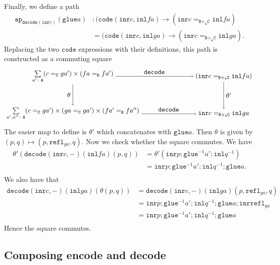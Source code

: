 \message{ !name(notes.tex)}\documentclass[12pt]{amsart}
\newcommand{\inv}{^{-1}}
\newcommand{\type}[1]{\mathtt{#1}}
\newcommand{\tin}{\colon}
\newcommand{\A}{\type{A}}
\newcommand{\B}{\type{B}}
\newcommand{\C}{\type{C}}
\newcommand{\BAC}{\B +_{\A} \C}
\newcommand{\ap}{\type{ap}}
\newcommand{\inl}{\type{inl}}
\newcommand{\inr}{\type{inr}}
\newcommand{\glue}{\type{glue}}
\newcommand{\refl}{\type{refl}}
\newcommand{\code}{\type{code}}
\newcommand{\decode}{\type{decode}}
\theoremstyle{remark}
\theoremstyle{definition}
\begin{document}
Finally, we define a path
%
\begin{align*}
  \ap_{\decode ( \inr c )} (\glue a) & \tin
  ( \code ( \inr c , \inl fa ) \to ( \inr c =_{\BAC} \inl fa ) \\
  & =  ( \code ( \inr c , \inl ga ) \to ( \inr c =_{\BAC} \inl ga ).
\end{align*}
%
Replacing the two \( \code \) expressions with their definitions, this
path is constructed as a commuting square
\[
  \begin{tikzpicture}
    \node (1) at (-4,1)
      { \(
        \sum\limits_{a' \tin \A}
        ( c =_{\C} ga' ) \times ( fa =_{\B} fa' )
      \) }; 
    \node (2) at (-4,-1)
      { \(
        \sum\limits_{a',a'' \tin \A}
        ( c =_{\C} ga' ) \times ( ga =_{\C} ga' ) \times
        ( fa' =_{\B} fa'' )
      \) };
    \node (3) at (4,1)
      { \(
        ( \inr c =_{\BAC} \inl fa )
      \) };
    \node (4) at (4,-1)
      { \(
        \inr c =_{\BAC} \inl ga
      \) };
    \draw [->] (1) to node [left] {\( \theta \)} (2);
    \draw [->] (1) to node [above] {\( \decode \)} (3);
    \draw [->] (2) to node [above] {\( \decode \)} (4);
    \draw [->] (3) to node [right] {\( \theta' \)} (4); 
  \end{tikzpicture}
\]
The easier map to define is \( \theta' \) which  concatenates
with \( \glue a \).  Then \( \theta \) is given by
\(
  ( p,q ) \mapsto ( p, \refl_{ga} , q ).
\)
Now we check whether the square commutes. We have
%
\begin{align*}
  \theta' ( \decode ( \inr c , - ) ( \inl fa ) ( p,q ) )
  & = \theta' ( \inr p ; \glue^{-1} a' ; \inl q^{-1}  ) \\
  & = \inr p ; \glue^{-1} a' ; \inl q^{-1} ; \glue a. \\
\end{align*}
%
We also have that
%
\begin{align*}
  \decode ( \inr c , - ) ( \inl ga ) ( \theta ( p,q ) )
  & = \decode ( \inr c , - ) ( \inl ga ) ( p,\refl_{ga},q ) \\
  & =  \inr p ; \glue\inv a' ; \inl q\inv ; \glue a ; \inr \refl_{ga} \\
  & =  \inr p ; \glue\inv a' ; \inl q\inv ; \glue a  \\
\end{align*}
%
Hence the square commutes.


\subsection{Composing encode and decode}
\end{document}
